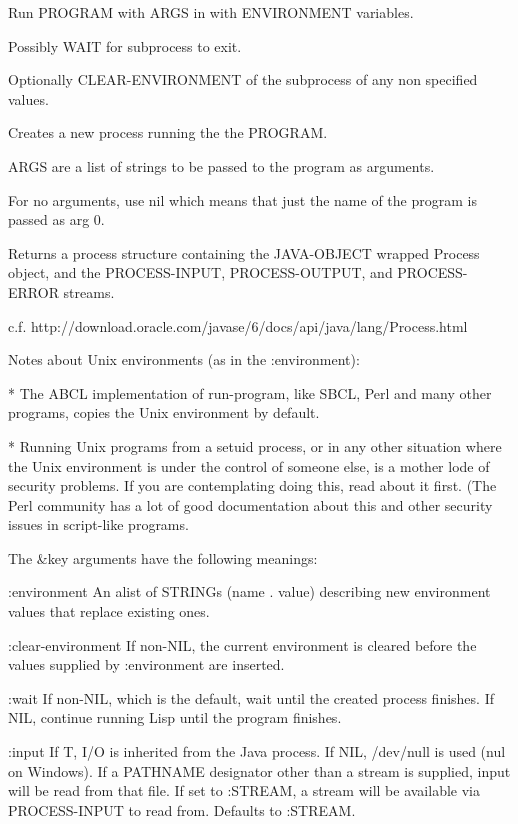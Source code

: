 \begin{adjustwidth}{5em}{5em}
Run PROGRAM with ARGS in with ENVIRONMENT variables.

Possibly WAIT for subprocess to exit.

Optionally CLEAR-ENVIRONMENT of the subprocess of any non specified values.

Creates a new process running the the PROGRAM.

ARGS are a list of strings to be passed to the program as arguments.

For no arguments, use nil which means that just the name of the
program is passed as arg 0.

Returns a process structure containing the JAVA-OBJECT wrapped Process
object, and the PROCESS-INPUT, PROCESS-OUTPUT, and PROCESS-ERROR streams.

c.f. http://download.oracle.com/javase/6/docs/api/java/lang/Process.html

Notes about Unix environments (as in the :environment):

    * The ABCL implementation of run-program, like SBCL, Perl and many
      other programs, copies the Unix environment by default.

    * Running Unix programs from a setuid process, or in any other
      situation where the Unix environment is under the control of
      someone else, is a mother lode of security problems. If you are
      contemplating doing this, read about it first. (The Perl
      community has a lot of good documentation about this and other
      security issues in script-like programs.

The \&key arguments have the following meanings:

:environment
    An alist of STRINGs (name . value) describing new
    environment values that replace existing ones.

:clear-environment
    If non-NIL, the current environment is cleared before the
    values supplied by :environment are inserted.

:wait
    If non-NIL, which is the default, wait until the created process
    finishes. If NIL, continue running Lisp until the program
    finishes.

:input
    If T, I/O is inherited from the Java process. If NIL, /dev/null is used
    (nul on Windows). If a PATHNAME designator other than a stream is
    supplied, input will be read from that file. If set to :STREAM, a stream
    will be available via PROCESS-INPUT to read from. Defaults to :STREAM.


\end{adjustwidth}
